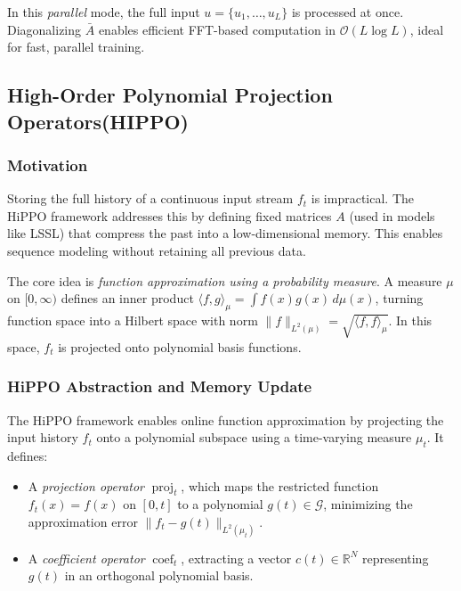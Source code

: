 \documentclass{article}
\theoremstyle{definition}
\begin{document}
In this \textit{parallel} mode, the full input \(u = \{u_1, \dots, u_L\}\) is processed at once. Diagonalizing \(\bar{A}\) enables efficient FFT-based computation in \(\mathcal{O}(L \log L)\), ideal for fast, parallel training.



\subsection{High-Order Polynomial Projection Operators(HIPPO)}
\subsubsection{ Motivation}
Storing the full history of a continuous input stream \( f_t \) is impractical. The HiPPO framework addresses this by defining fixed matrices \( A \) (used in models like LSSL) that compress the past into a low-dimensional memory. This enables sequence modeling without retaining all previous data.

The core idea is \emph{function approximation using a probability measure}. A measure \( \mu \) on \( [0,\infty) \) defines an inner product \( \langle f, g \rangle_\mu = \int f(x)g(x)\,d\mu(x) \), turning function space into a Hilbert space with norm \( \|f\|_{L^2(\mu)} = \sqrt{\langle f, f \rangle_\mu} \). In this space, \( f_t \) is projected onto polynomial basis functions.



\subsubsection{HiPPO Abstraction and Memory Update}

The HiPPO framework enables online function approximation by projecting the input history \( f_t \) onto a polynomial subspace using a time-varying measure \( \mu_t \). It defines:

\begin{itemize}
  \item A \emph{projection operator} \( \operatorname{proj}_t \), which maps the restricted function \( f_t(x) = f(x) \) on \([0, t]\) to a polynomial \( g(t) \in \mathcal{G} \), minimizing the approximation error \( \|f_t - g(t)\|_{L^2(\mu_t)} \).
  \item A \emph{coefficient operator} \( \operatorname{coef}_t \), extracting a vector \( c(t) \in \mathbb{R}^N \) representing \( g(t) \) in an orthogonal polynomial basis.
\end{itemize}
\end{document}

